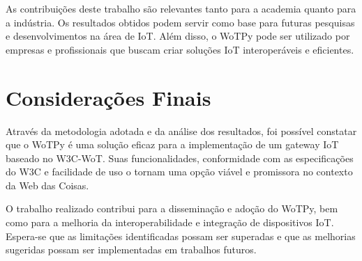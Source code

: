 As contribuições deste trabalho são relevantes tanto para a academia quanto para a indústria. Os resultados obtidos podem servir como base para futuras pesquisas e desenvolvimentos na área de IoT. Além disso, o WoTPy pode ser utilizado por empresas e profissionais que buscam criar soluções IoT interoperáveis e eficientes.

\section{Considerações Finais}

Através da metodologia adotada e da análise dos resultados, foi possível constatar que o WoTPy é uma solução eficaz para a implementação de um gateway IoT baseado no W3C-WoT. Suas funcionalidades, conformidade com as especificações do W3C e facilidade de uso o tornam uma opção viável e promissora no contexto da Web das Coisas.

O trabalho realizado contribui para a disseminação e adoção do WoTPy, bem como para a melhoria da interoperabilidade e integração de dispositivos IoT. Espera-se que as limitações identificadas possam ser superadas e que as melhorias sugeridas possam ser implementadas em trabalhos futuros.
